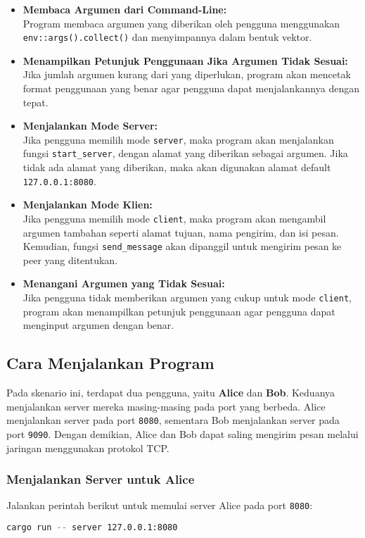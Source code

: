 \begin{itemize}
	\item \textbf{Membaca Argumen dari Command-Line:} \\
	Program membaca argumen yang diberikan oleh pengguna menggunakan \texttt{env::args().collect()} dan menyimpannya dalam bentuk vektor.
	
	\item \textbf{Menampilkan Petunjuk Penggunaan Jika Argumen Tidak Sesuai:} \\
	Jika jumlah argumen kurang dari yang diperlukan, program akan mencetak format penggunaan yang benar agar pengguna dapat menjalankannya dengan tepat.
	
	\item \textbf{Menjalankan Mode Server:} \\
	Jika pengguna memilih mode \texttt{server}, maka program akan menjalankan fungsi \texttt{start\_server}, dengan alamat yang diberikan sebagai argumen. Jika tidak ada alamat yang diberikan, maka akan digunakan alamat default \texttt{127.0.0.1:8080}.
	
	\item \textbf{Menjalankan Mode Klien:} \\
	Jika pengguna memilih mode \texttt{client}, maka program akan mengambil argumen tambahan seperti alamat tujuan, nama pengirim, dan isi pesan. Kemudian, fungsi \texttt{send\_message} akan dipanggil untuk mengirim pesan ke peer yang ditentukan.
	
	\item \textbf{Menangani Argumen yang Tidak Sesuai:} \\
	Jika pengguna tidak memberikan argumen yang cukup untuk mode \texttt{client}, program akan menampilkan petunjuk penggunaan agar pengguna dapat menginput argumen dengan benar.
\end{itemize}


\subsection{Cara Menjalankan Program}

Pada skenario ini, terdapat dua pengguna, yaitu \textbf{Alice} dan \textbf{Bob}. Keduanya menjalankan server mereka masing-masing pada port yang berbeda. Alice menjalankan server pada port \texttt{8080}, sementara Bob menjalankan server pada port \texttt{9090}. Dengan demikian, Alice dan Bob dapat saling mengirim pesan melalui jaringan menggunakan protokol TCP.

\subsubsection{Menjalankan Server untuk Alice}
Jalankan perintah berikut untuk memulai server Alice pada port \texttt{8080}:
\begin{lstlisting}[language=bash]
	cargo run -- server 127.0.0.1:8080
\end{lstlisting}

